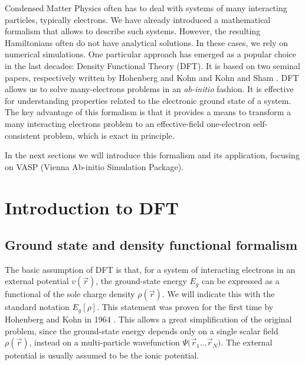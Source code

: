 Condensed Matter Physics often has to deal with systems of many interacting particles, typically electrons. We have already introduced a mathematical formalism that allows to describe such systems. However, the resulting Hamiltonians often do not have analytical solutions. In these cases, we rely on numerical simulations. One particular approach has emerged as a popular choice in the last decades: Density Functional Theory (DFT). It is based on two seminal papers, respectively written by Hohenberg and Kohn \cite{hohenberg1964} and Kohn and Sham \cite{kohn1965}. DFT allows us to solve many-electrons problems in an \emph{ab-initio} fashion. It is effective for understanding properties related to the electronic ground state of a system. The key advantage of this formalism is that it provides a means to transform a many interacting electrons problem to an effective-field one-electron self-consistent problem, which is exact in principle.

In the next sections we will introduce this formalism and its application, focusing on VASP (Vienna Ab-initio Simulation Package).
\section{Introduction to DFT}
\subsection{Ground state and density functional formalism}
The basic assumption of DFT is that, for a system of interacting electrons in an external potential $v(\vec{r})$, the ground-state energy $E_g$ can be expressed as a functional of the sole charge density $\rho(\vec{r})$. We will indicate this with the standard notation $E_g[\rho]$. This statement was proven for the first time by Hohenberg and Kohn in 1964 \cite{hohenberg1964}. This allows a great simplification of the original problem, since the ground-state energy depends only on a single scalar field $\rho(\vec{r})$, instead on a multi-particle wavefunction $\Psi{(\vec{r}_1\dots \vec{r}_N})$. The external potential is usually assumed to be the ionic potential.

